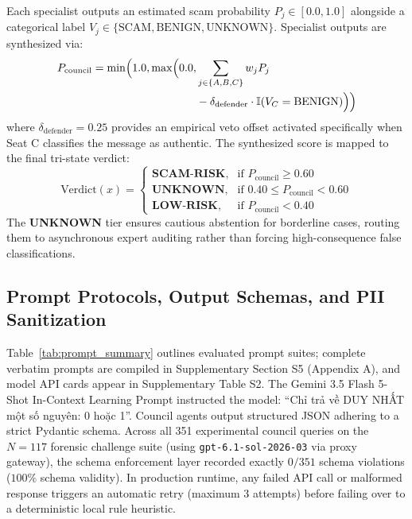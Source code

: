 Each specialist outputs an estimated scam probability $P_j \in [0.0, 1.0]$ alongside a categorical label $V_j \in \{\text{SCAM}, \text{BENIGN}, \text{UNKNOWN}\}$. Specialist outputs are synthesized via:
\begin{equation}
\label{eq:council_aggregation}
\begin{split}
P_{\text{council}} = \min\Bigl(1.0, \max\Bigl(0.0, &\sum_{j \in \{A, B, C\}} w_j P_j \\
&- \delta_{\text{defender}} \cdot \mathbb{I}(V_C = \text{BENIGN})\Bigr)\Bigr)
\end{split}
\end{equation}
where $\delta_{\text{defender}} = 0.25$ provides an empirical veto offset activated specifically when Seat C classifies the message as authentic. The synthesized score is mapped to the final tri-state verdict:
\begin{equation}
\label{eq:verdict}
\text{Verdict}(x) = \begin{cases}
\textbf{SCAM-RISK}, & \text{if } P_{\text{council}} \ge 0.60 \\
\textbf{UNKNOWN},   & \text{if } 0.40 \le P_{\text{council}} < 0.60 \\
\textbf{LOW-RISK},  & \text{if } P_{\text{council}} < 0.40
\end{cases}
\end{equation}
The \textbf{UNKNOWN} tier ensures cautious abstention for borderline cases, routing them to asynchronous expert auditing rather than forcing high-consequence false classifications.

\subsection{Prompt Protocols, Output Schemas, and PII Sanitization}
\label{subsec:prompts_pii}

Table~\ref{tab:prompt_summary} outlines evaluated prompt suites; complete verbatim prompts are compiled in Supplementary Section S5 (Appendix A), and model API cards appear in Supplementary Table S2. The Gemini 3.5 Flash 5-Shot In-Context Learning Prompt instructed the model: ``Chỉ trả về DUY NHẤT một số nguyên: 0 hoặc 1''. Council agents output structured JSON adhering to a strict Pydantic schema. Across all 351 experimental council queries on the $N=117$ forensic challenge suite (using \texttt{gpt-6.1-sol-2026-03} via proxy gateway), the schema enforcement layer recorded exactly $0/351$ schema violations ($100\%$ schema validity). In production runtime, any failed API call or malformed response triggers an automatic retry (maximum 3 attempts) before failing over to a deterministic local rule heuristic.

